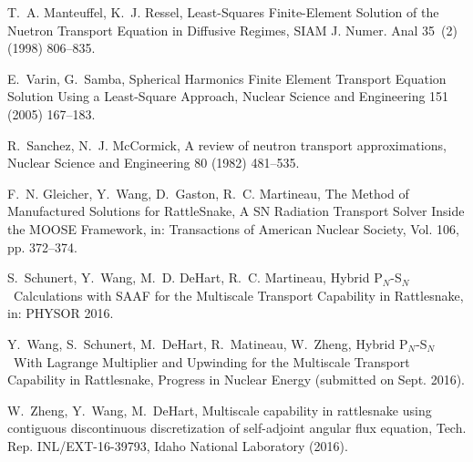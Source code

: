 \documentclass[review]{elsarticle}
\begin{document}
\begin{thebibliography}{10}
	T.~A. Manteuffel, K.~J. Ressel, {Least-Squares Finite-Element Solution of the
		Nuetron Transport Equation in Diffusive Regimes}, SIAM J. Numer. Anal 35~(2)
	(1998) 806--835.
	
	E.~Varin, G.~Samba, {Spherical Harmonics Finite Element Transport Equation
		Solution Using a Least-Square Approach}, Nuclear Science and Engineering 151
	(2005) 167--183.
	
	R.~Sanchez, N.~J. McCormick, A review of neutron transport approximations,
	Nuclear Science and Engineering 80 (1982) 481--535.
	
	F.~N. Gleicher, Y.~Wang, D.~Gaston, R.~C. Martineau, {The Method of
		Manufactured Solutions for RattleSnake, A SN Radiation Transport Solver
		Inside the MOOSE Framework}, in: {Transactions of American Nuclear Society},
	Vol. 106, pp. 372--374.
	
	S.~Schunert, Y.~Wang, M.~D. DeHart, R.~C. Martineau, {Hybrid P$_N$-S$_N$\
		Calculations with SAAF for the Multiscale Transport Capability in
		Rattlesnake}, in: {PHYSOR 2016}.
	
	Y.~Wang, S.~Schunert, M.~DeHart, R.~Matineau, W.~Zheng, {Hybrid P$_N$-S$_N$\
		With Lagrange Multiplier and Upwinding for the Multiscale Transport
		Capability in Rattlesnake}, Progress in Nuclear Energy (submitted on Sept.
	2016).
	
	W.~Zheng, Y.~Wang, M.~DeHart, Multiscale capability in rattlesnake using
	contiguous discontinuous discretization of self-adjoint angular flux
	equation, Tech. Rep. INL/EXT-16-39793, Idaho National Laboratory (2016).
	
\end{thebibliography}
\end{document}
